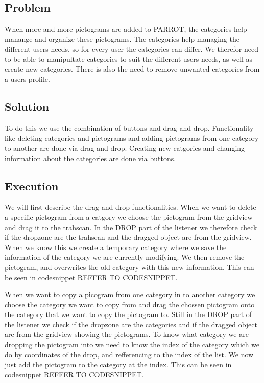\section{} %
\subsection*{Problem}
When more and more pictograms are added to PARROT, the categories help manange and organize these pictograms. 
The categories help managing the different users needs, so for every user the categories can differ. 
We therefor need to be able to manipultate categories to suit the different users needs, as well as create new categories. 
There is also the need to remove unwanted categories from a users profile.


\subsection*{Solution}
To do this we use the combination of buttons and drag and drop. 
Functionality like deleting categories and pictograms and adding pictograms from one category to another are done via drag and drop. 
Creating new catgories and changing information about the categories are done via buttons. 


\subsection*{Execution}
We will first describe the drag and drop functionalities. 
When we want to delete a specific pictogram from a catgory we choose the pictogram from the gridview and drag it to the trahscan. 
In the DROP part of the listener we therefore check if the dropzone are the trahscan and the dragged object are from the gridview.
When we know this we create a temporary category where we save the information of the category we are currently modifying. We then remove the pictogram, and overwrites the old category with this new information.
This can be seen in codesnippet REFFER TO CODESNIPPET.


When we want to copy a picogram from one category in to another category we choose the category we want to copy from and drag the chossen pictogram onto the category that we want to copy the pictogram to. 
Still in the DROP part of the listener we check if the dropzone are the categories and if the dragged object are from the gridview showing the pictograms.
To know what category we are dropping the pictogram into we need to know the index of the category which we do by coordinates of the drop, and refferencing to the index of the list.
We now just add the pictogram to the category at the index.
This can be seen in codesnippet REFFER TO CODESNIPPET.

